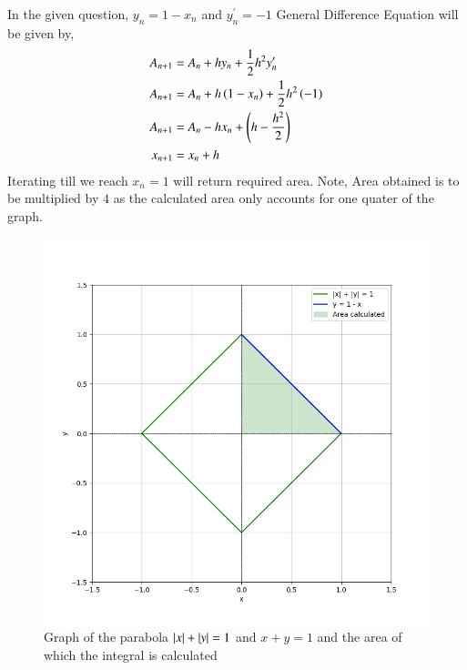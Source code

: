 \documentclass[journal]{IEEEtran}
\begin{document}
In the given question, $y_n=1 - x_n$ and $y^{\prime}_n=-1$\newline
General Difference Equation will be given by,
\begin{align}
  A_{n+1}&=A_n+hy_n+\frac{1}{2}h^2y^{\prime}_n\\
  A_{n+1}&=A_n+h\left(1-x_n\right)+\frac{1}{2}h^2\left(-1\right)\\
  A_{n+1}&=A_n -hx_n+\left(h-\frac{h^2}{2}\right)\\
  x_{n+1}&=x_n+h
\end{align}
Iterating till we reach $x_n=1$ will return required area. Note, Area obtained is to be multiplied by $4$ as the calculated area only accounts for one quater of the graph.\newline
\begin{figure}[h!]
   \centering
   \includegraphics[width=1\columnwidth]{figs/fig.png}
   \caption{Graph of the parabola $\left\vert x\right\vert+\left\vert y\right\vert = 1$ and $x+y=1$ and the area of which the integral is calculated}
   \label{stemplot}
\end{figure}
\end{document}
